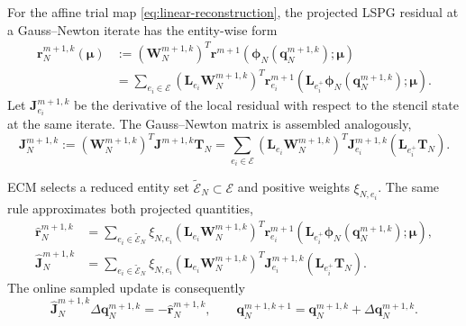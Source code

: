 \documentclass[11pt]{article}
\newcommand{\q}{\mathbf q}
\newcommand{\mub}{\bm\mu}
\begin{document}
For the affine trial map \eqref{eq:linear-reconstruction}, the projected
LSPG residual at a Gauss--Newton iterate has the entity-wise form
\begin{equation}
\begin{aligned}
\mathbf r_N^{m+1,k}(\mub)
&:=\left(\mathbf W_N^{m+1,k}\right)^T
\mathbf r^{m+1}\!\left(\boldsymbol\phi_N(\q_N^{m+1,k});\mub\right)\\
&=\sum_{e_i\in\mathcal E}
\left(\mathbf L_{e_i}\mathbf W_N^{m+1,k}\right)^T
\mathbf r_{e_i}^{m+1}\!\left(
\mathbf L_{e_i^+}\boldsymbol\phi_N(\q_N^{m+1,k});\mub\right).
\end{aligned}
\label{eq:linear-projected-residual}
\end{equation}
Let $\mathbf J_{e_i}^{m+1,k}$ be the derivative of the local residual with
respect to the stencil state at the same iterate.  The Gauss--Newton matrix
is assembled analogously,
\begin{equation}
\mathbf J_N^{m+1,k}:=
\left(\mathbf W_N^{m+1,k}\right)^T\mathbf J^{m+1,k}\mathbf T_N
=\sum_{e_i\in\mathcal E}
\left(\mathbf L_{e_i}\mathbf W_N^{m+1,k}\right)^T
\mathbf J_{e_i}^{m+1,k}\left(\mathbf L_{e_i^+}\mathbf T_N\right).
\label{eq:linear-projected-jacobian}
\end{equation}

ECM selects a reduced entity set $\widetilde{\mathcal E}_N\subset\mathcal E$
and positive weights $\xi_{N,e_i}$.  The same rule approximates both
projected quantities,
\begin{equation}
\begin{aligned}
\widehat{\mathbf r}_N^{m+1,k}
&=\sum_{e_i\in\widetilde{\mathcal E}_N}\xi_{N,e_i}
\left(\mathbf L_{e_i}\mathbf W_N^{m+1,k}\right)^T
\mathbf r_{e_i}^{m+1}\!\left(
\mathbf L_{e_i^+}\boldsymbol\phi_N(\q_N^{m+1,k});\mub\right),\\
\widehat{\mathbf J}_N^{m+1,k}
&=\sum_{e_i\in\widetilde{\mathcal E}_N}\xi_{N,e_i}
\left(\mathbf L_{e_i}\mathbf W_N^{m+1,k}\right)^T
\mathbf J_{e_i}^{m+1,k}\left(\mathbf L_{e_i^+}\mathbf T_N\right).
\end{aligned}
\label{eq:linear-ecm-sampled-normal-equations}
\end{equation}
The online sampled update is consequently
\begin{equation}
\widehat{\mathbf J}_N^{m+1,k}\Delta\q_N^{m+1,k}
=-\widehat{\mathbf r}_N^{m+1,k},\qquad
\q_N^{m+1,k+1}=\q_N^{m+1,k}+\Delta\q_N^{m+1,k}.
\label{eq:linear-hprom-gn-update}
\end{equation}
\end{document}
